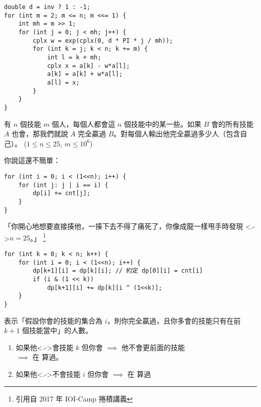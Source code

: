 \documentclass[standalone]{beamer}
\begin{document}
\begin{frame}[fragile]{}
  \begin{verbatim}
double d = inv ? 1 : -1;
for (int m = 2; m <= n; m <<= 1) {
    int mh = m >> 1;
    for (int j = 0; j < mh; j++) {
        cplx w = exp(cplx(0, d * PI * j / mh));
        for (int k = j; k < n; k += m) {
            int l = k + mh;
            cplx x = a[k] - w*a[l];
            a[k] = a[k] + w*a[l];
            a[l] = x;
        }
    }
}
  \end{verbatim}
\end{frame}

\begin{frame}[fragile]{}
  \begin{problem}[經典問題]
    有 $n$ 個技能 $m$ 個人，每個人都會這 $n$ 個技能中的某一些。如果 $B$ 會的所有技能 $A$
    也會，那我們就說 $A$ 完全贏過 $B$。對每個人輸出他完全贏過多少人（包含自己）。
    ($1 \leq n \leq 25$, $m \leq 10^6$)
  \end{problem}
  \pause \disskip
  你說這還不簡單： \disskip
  \begin{verbatim}
for (int i = 0; i < (1<<n); i++) {
    for (int j: j | i == i) {
        dp[i] += cnt[j];
    }
}
\end{verbatim}
\pause \disskip
「你開心地想要直接揍他，一揍下去不得了痛死了，你像成龍一樣甩手時發現 \alert<.->{$n = 25$}。」
\footnote{引用自 2017 年 IOI-Camp 捲積講義}
\end{frame}

\begin{frame}[fragile]{}
  \begin{verbatim}
for (int k = 0; k < n; k++) {
    for (int i = 0; i < (1<<n); i++) {
        dp[k+1][i] = dp[k][i]; // 約定 dp[0][i] = cnt[i]
        if (i & (1 << k))
            dp[k+1][i] += dp[k][i ^ (1<<k)];
    }
}
\end{verbatim}
\pause \disskip
{} 表示「假設你會的技能的集合為 $i$，則你完全贏過，且你多會的技能只有在前 $k+1$ 個技能當中」的人數。
\pause
\disskip
\begin{enumerate}[<+->]
  \item 如果他\alert<.->{會}技能 $k$ 但你會 $\implies$ 他不會更前面的技能 \\
    $\implies$ 在  算過。
  \item 如果他\alert<.->{不會}技能 $i$ 但你會 $\implies$ 在 算過
\end{enumerate}
\end{frame}
\end{document}
